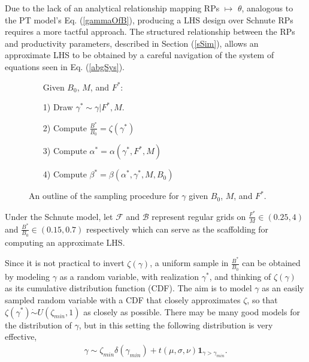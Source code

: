 %




Due to the lack of an analytical relationship mapping RPs $\mapsto$ $\theta$, 
analogous to the PT model's Eq. (\ref{gammaOfB}), producing a LHS design 
over Schnute RPs requires a more tactful approach.
The structured relationship between the RPs and productivity parameters, 
described in Section (\ref{sSim}), allows an approximate LHS to be obtained by 
a careful navigation of the system of equations seen in Eq. (\ref{abgSys}).

%
\begin{figure}
\vspace{-0.5cm}
\begin{itemize}
        \item[] \hspace*{-1cm}Given $B_0$, $M$, and $F^*$:
        \item[1)] Draw $\gamma^* \sim \gamma|F^*, M$.
        \item[2)] Compute $\frac{B^*}{B_0} = \zeta(\gamma^*)$
        \item[3)] Compute $\alpha^* = \alpha(\gamma^*, F^*, M)$
        \item[4)] Compute $\beta^* = \beta(\alpha^*, \gamma^*, M, B_0)$
\end{itemize}
\vspace{-0.5cm}
\caption{ An outline of the sampling procedure for $\gamma$ 
given $B_0$, $M$, and $F^*$.
}
\end{figure}

%
Under the Schnute model, let $\mathcal{F}$ and $\mathcal{B}$ represent regular grids on
\mbox{$\frac{F^*}{M}\in(0.25, 4)$} and \mbox{$\frac{B^*}{B_0}\in(0.15, 0.7)$}
respectively which can serve as the scaffolding for computing an approximate LHS.

%
Since it is not practical to invert $\zeta(\gamma)$, a uniform sample in 
$\frac{B^*}{B_0}$ can be obtained by modeling $\gamma$ as a random 
variable, with realization $\gamma^*$, and thinking of $\zeta(\gamma)$ as its 
cumulative distribution function (CDF). The aim is to model $\gamma$ as an 
easily sampled random variable with a CDF that closely approximates $\zeta$, so 
that $\zeta(\gamma^*)\dot\sim U(\zeta_{min},1)$ as closely as possible. There 
may be many good models for the distribution of $\gamma$, but in this setting 
the following distribution is very effective,
%
\begin{align}
\gamma \sim \zeta_{min}\delta(\gamma_{min}) + t(\mu, \sigma, \nu)\bm{1}_{\gamma>\gamma_{min}}. \label{mixT}
\end{align}

